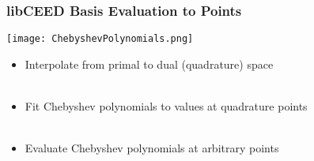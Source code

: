 \documentclass{beamer}
\begin{document}

\begin{frame}
\begin{center}
\frametitle{libCEED Basis Evaluation to Points}

\begin{center}
\texttt{[image: ChebyshevPolynomials.png]}
\end{center}

\begin{itemize}

\item Interpolate from primal to dual (quadrature) space\\

~\\

\item Fit Chebyshev polynomials to values at quadrature points\\

~\\

\item Evaluate Chebyshev polynomials at arbitrary points\\

\end{itemize}

\end{center}
\end{frame}

\end{document}
